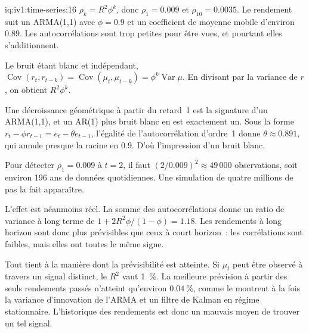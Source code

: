 \begin{solution}{iq:iv1:time-series:16}
$\rho_k = R^2\phi^k$, donc $\rho_1 = 0.009$ et $\rho_{10} = 0.0035$. Le rendement suit un ARMA(1,1) avec $\phi = 0.9$ et un coefficient de moyenne mobile d'environ $0.89$. Les autocorrélations sont trop petites pour être vues, et pourtant elles s'additionnent.

Le bruit étant blanc et indépendant, $\operatorname{Cov}(r_t, r_{t - k}) = \operatorname{Cov}(\mu_t, \mu_{t - k}) = \phi^k\operatorname{Var}\mu$. En divisant par la variance de $r$, on obtient $R^2\phi^k$.

Une décroissance géométrique à partir du retard~1 est la signature d'un ARMA(1,1), et un AR(1) plus bruit blanc en est exactement un. Sous la forme $r_t - \phi r_{t - 1} = e_t - \theta e_{t - 1}$, l'égalité de l'autocorrélation d'ordre~1 donne $\theta \approx 0.891$, qui annule presque la racine en $0.9$. D'où l'impression d'un bruit blanc.

Pour détecter $\rho_1 = 0.009$ à $t = 2$, il faut $(2/0.009)^2 \approx 49\,000$ observations, soit environ 196 ans de données quotidiennes. Une simulation de quatre millions de pas la fait apparaître.

L'effet est néanmoins réel. La somme des autocorrélations donne un ratio de variance à long terme de $1 + 2R^2\phi/(1 - \phi) = 1.18$. Les rendements à long horizon sont donc plus prévisibles que ceux à court horizon~: les corrélations sont faibles, mais elles ont toutes le même signe.

Tout tient à la manière dont la prévisibilité est atteinte. Si $\mu_t$ peut être observé à travers un signal distinct, le $R^2$ vaut 1~\%. La meilleure prévision à partir des seuls rendements passés n'atteint qu'environ $0.04~\%$, comme le montrent à la fois la variance d'innovation de l'ARMA et un filtre de Kalman en régime stationnaire. L'historique des rendements est donc un mauvais moyen de trouver un tel signal.



\end{solution}

